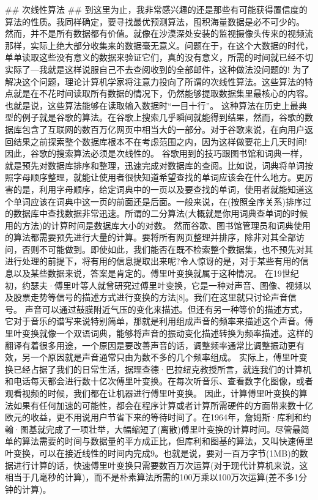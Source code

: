 ## 次线性算法 ## 
到这里为止，我非常感兴趣的还是那些有可能获得置信度的算法的性质。我同样确定，要寻找最优预测算法，囤积海量数据是必不可少的。
然而，并不是所有数据都有价值。就像在沙漠深处安装的监视摄像头传来的视频流那样，实际上绝大部分收集来的数据毫无意义。问题在于，在这个大数据的时代，单单读取这些没有意义的数据来验证它们，真的没有意义，所需的时间就已经不切实际了---我就是这样说服自己不去查阅收到的全部邮件，这种做法没问题的!
为了解决这个问题，理论计算机学家将注意力投向了所谓的次线性算法。这些算法的特点就是在不花时间读取所有数据的情况下，仍然能够提取数据集里最核心的内容。也就是说，这些算法能够在读取输入数据时“一目十行”。
这种算法在历史上最典型的例子就是谷歌的算法。在谷歌上搜索几乎瞬间就能得到结果，然而，谷歌的数据库包含了互联网的数百万亿网页中相当大的一部分。对于谷歌来说，在向用户返回结果之前探索整个数据库根本不在考虑范围之内，因为这样做要花上几天时间!因此，谷歌的搜索算法必须是次线性的。
谷歌用到的技巧跟图书馆和词典一样，就是预先对数据库排序和整理，迅速完成对数据库的查阅。比如说，词典将单词按照字母顺序整理，就能让使用者很快知道希望查找的单词应该会在什么地方。更厉害的是，利用字母顺序，给定词典中的一页以及要查找的单词，使用者就能知道这个单词应该在词典中这一页的前面还是后面。一般来说，在(按照全序关系)排序过的数据库中查找数据非常迅速。所谓的二分算法(大概就是你用词典查单词的时候用的方法)的计算时间是数据库大小的对数。
然而谷歌、图书馆管理员和词典使用的算法都需要预先进行大量的计算。要将所有网页整理并排序，除非对其全部访问，否则不可能做到。即使如此，我们能否在既不检索整个数据集，也不预先对其进行处理的前提下，将有用的信息提取出来呢?令人惊讶的是，对于某些有用的信息以及某些数据来说，答案是肯定的。傅里叶变换就属于这种情况。
在19世纪初，约瑟夫·傅里叶等人就曾研究过傅里叶变换，它是一种对声音、图像、视频以及股票走势等信号的描述方式进行变换的方法[8]。我们在这里就只讨论声音信号。
声音可以通过鼓膜附近气压的变化来描述。但还有另一种等价的描述方式，它对于音乐的谱写来说特别简单，那就是利用组成声音的频率来描述这个声音。傅里叶变换就像一个双语词典，能够将声音的振动变化描述转换为频率描述。这样的翻译有着很多用途，一个原因是要改善声音的话，调整频率通常比调整振动更有效，另一个原因就是声音通常只由为数不多的几个频率组成。
实际上，傅里叶变换已经占据了我们的日常生活，据理查德·巴拉纽克教授所言，就连我们的计算机和电话每天都会进行数十亿次傅里叶变换。在每次听音乐、查看数字化图像，或者观看视频的时候，我们都在让机器进行傅里叶变换。
因此，计算傅里叶变换的算法如果有任何加速的可能性，都会在程序计算或者计算所需硬件的方面带来数十亿欧元的收益，更不用说用户节省下来的等待时间了。在1964年，詹姆斯·库利和约翰·图基就完成了一项壮举，大幅缩短了(离散)傅里叶变换的计算时间。尽管最简单的算法需要的时间与数据量的平方成正比，但库利和图基的算法，又叫快速傅里叶变换，可以在接近线性的时间内完成9。也就是说，要对一百万字节(1MB)的数据进行计算的话，快速傅里叶变换只需要数百万次运算(对于现代计算机来说，这相当于几毫秒的计算)，而不是朴素算法所需的100万乘以100万次运算(差不多1分钟的计算)。
